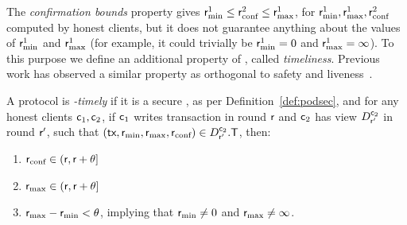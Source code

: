 \begin{definition}
\begin{description}[leftmargin=4mm, labelindent=4mm]
\end{description}
\end{definition}


The \emph{confirmation bounds} property gives $\rmin^1 \leq \rconf^2 \leq \rmax^1$, for $\rmin^1, \rmax^1, \rconf^2$ computed by honest clients, but it does not guarantee anything about the values of $\rmin^1$ and $\rmax^1$ (for example, it could trivially be $\rmin^1=0$ and $\rmax^1=\infty$).
To this purpose we define an additional property of \podtm, called \emph{timeliness}.
Previous work has observed a similar property as orthogonal to safety and liveness~\cite{EPRINT:TziSriZin23}.

\begin{definition}\label{def:pod-timely}
    A \podtm protocol is \emph{\parTemp-timely} if it is a secure \podtm, as per Definition~\ref{def:podsec}, and for any honest clients $\client_1,\client_2$, if $\client_1$ writes transaction \tx in round $\round$ and $\client_2$ has view $\podView{\client_2}{\round'}$ in round $\round'$, such that $(\tx, \rmin, \rmax, \rconf) \in \podView{\client_2}{\round'}.\txSet$, then:
    \begin{enumerate}
        \item $\rconf \in (\round, \round + \parTemp]$
        \item $\rmax \in (\round, \round + \parTemp]$
        \item $\rmax - \rmin < \parTemp$, implying that $\rmin \neq 0$ and $\rmax \neq \infty$.
    \end{enumerate}
\end{definition}


